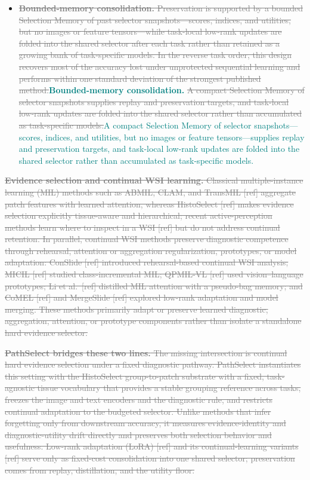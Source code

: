 \documentclass{article}
\newif\ifmarkup \markuptrue
\newcommand{\repc}[3]{\ifmarkup\textcolor{gray}{\sout{#2}}\textcolor{#1}{#3}\else#3\fi}
\newcommand{\repG}[2]{\repc{teal}{#1}{#2}}    %
\begin{document}
\begin{itemize}
    \item \repG{\textbf{Bounded-memory consolidation.} Preservation is supported by a bounded Selection Memory of past selector snapshots---scores, indices, and utilities, but no images or feature tensors---while task-local low-rank updates are folded into the shared selector after each task rather than retained as a growing bank of task-specific models. In the reverse task order, this design recovers most of the accuracy lost under unprotected sequential learning and performs within one standard deviation of the strongest published method.}{\textbf{Bounded-memory consolidation.} \repG{A compact Selection Memory of selector snapshots supplies replay and preservation targets, and task-local low-rank updates are folded into the shared selector rather than accumulated as task-specific models.}{A compact Selection Memory of selector snapshots---scores, indices, and utilities, but no images or feature tensors---supplies replay and preservation targets, and task-local low-rank updates are folded into the shared selector rather than accumulated as task-specific models.}}
\end{itemize}

\repG{\textbf{Evidence selection and continual WSI learning.}
Classical multiple-instance learning (MIL) methods such as ABMIL, CLAM, and TransMIL [ref] aggregate patch features with learned attention, whereas HistoSelect [ref] makes evidence selection explicitly tissue-aware and hierarchical; recent active-perception methods learn where to inspect in a WSI [ref] but do not address continual retention. In parallel, continual WSI methods preserve diagnostic competence through rehearsal, attention or aggregation regularization, prototypes, or model adaptation: ConSlide [ref] introduced rehearsal-based continual WSI analysis; MICIL [ref] studied class-incremental MIL; QPMIL-VL [ref] used vision--language prototypes; Li et al.\ [ref] distilled MIL attention with a pseudo-bag memory; and CoMEL [ref] and MergeSlide [ref] explored low-rank adaptation and model merging. These methods primarily adapt or preserve learned diagnostic, aggregation, attention, or prototype components rather than isolate a standalone hard evidence selector.}{}

\repG{\textbf{PathSelect bridges these two lines.}
The missing intersection is continual hard evidence selection under a fixed diagnostic pathway. PathSelect instantiates this setting with the HistoSelect group-to-patch substrate with a fixed, task-agnostic tissue vocabulary that provides a stable grouping reference across tasks, freezes the image and text encoders and the diagnostic rule, and restricts continual adaptation to the budgeted selector. Unlike methods that infer forgetting only from downstream accuracy, it measures evidence-identity and diagnostic-utility drift directly and preserves both selection behavior and usefulness. Low-rank adaptation (LoRA) [ref] and its continual-learning variants [ref] serve only as fixed-cost consolidation into one shared selector; preservation comes from replay, distillation, and the utility floor.}{}
\end{document}
